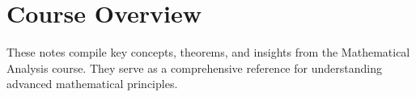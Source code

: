 \section{Course Overview}
\begin{note}
    These notes compile key concepts, theorems, and insights from the Mathematical Analysis course. 
    They serve as a comprehensive reference for understanding advanced mathematical principles.
\end{note}

